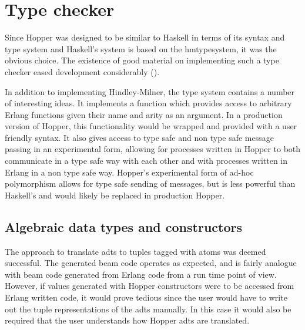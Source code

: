 \section{Type checker}

Since Hopper was designed to be similar to Haskell in terms of its syntax and type system and Haskell's system is based on the \Gls{hmtypesystem}, it was the obvious choice. The existence of good material on implementing such a type checker eased development considerably (). 

In addition to implementing Hindley-Milner, the type system contains a number of interesting ideas. It implements a function which provides access to arbitrary Erlang functions given their name and arity as an argument. In a production version of Hopper, this functionality would be wrapped and provided with a user friendly syntax. It also gives access to type safe and non type safe message passing in an experimental form, allowing for processes written in Hopper to both communicate in a type safe way with each other and with processes written in Erlang in a non type safe way. Hopper's experimental form of ad-hoc polymorphism allows for type safe sending of messages, but is less powerful than Haskell's and would likely be replaced in production Hopper.

\subsection{Algebraic data types and constructors}

The approach to translate \glspl{adt} to tuples tagged with atoms was deemed successful. The generated beam code operates as expected, and is fairly analogue with beam code generated from Erlang code from a run time point of view. However, if values generated with Hopper constructors were to be accessed from Erlang written code, it would prove tedious since the user would have to write out the tuple representations of the \glspl{adt} manually. In this case it would also be required that the user understands how Hopper \glspl{adt} are translated.